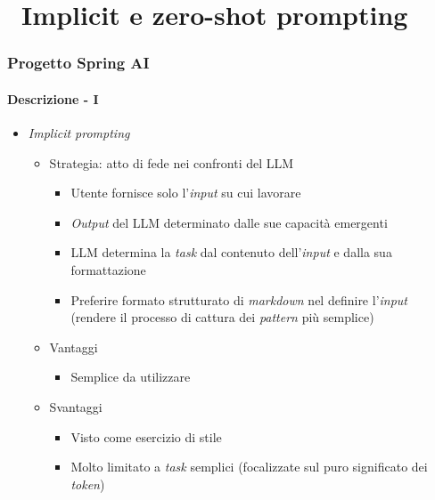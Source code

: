 \section{\faWrench\ Implicit e zero-shot prompting} %
\label{sec:spring-ai-gemini-implicit-zero-shot-prompting}
%
\begin{frame}[t,fragile] \frametitle{Progetto Spring AI}
    \framesubtitle{Descrizione - I}
    {\small
        \begin{itemize}[leftmargin=10pt,align=right]
            \item[\alertedcircled{1}] \textit{Implicit prompting}
            \begin{itemize}[leftmargin=10pt,align=right]
                \item[\alert{\faArrowCircleRight}] Strategia: atto di fede nei confronti del LLM
                \begin{itemize}[leftmargin=10pt,align=right]
                    \item[\alert{\faArrowCircleRight}] Utente fornisce solo l'\textit{input} su cui lavorare
                    \item[\alert{\faArrowCircleRight}] \textit{Output} del LLM determinato dalle sue \alert{capacità emergenti} 
                    \item[\alert{\faExclamationTriangle}] LLM determina la \textit{task} dal contenuto dell'\textit{input} e dalla sua formattazione
                    \item[\alert{\faExclamationTriangle}] Preferire formato strutturato di \textit{markdown} nel definire l'\textit{input} (rendere il processo di \alert{cattura dei \textit{pattern}} più semplice)
                \end{itemize}
                \item[\alert{\faArrowCircleRight}] Vantaggi
                \begin{itemize}[leftmargin=10pt,align=right]
                    \item[\alert{\faArrowCircleRight}] Semplice da utilizzare
                \end{itemize}
                \item[\alert{\faArrowCircleRight}] Svantaggi
                \begin{itemize}[leftmargin=10pt,align=right]
                    \item[\alert{\faArrowCircleRight}] Visto come esercizio di stile
                    \item[\alert{\faArrowCircleRight}] Molto limitato a \textit{task} semplici (focalizzate sul puro significato dei \textit{token})
                \end{itemize}               
            \end{itemize}
        \end{itemize}
    }
\end{frame}
